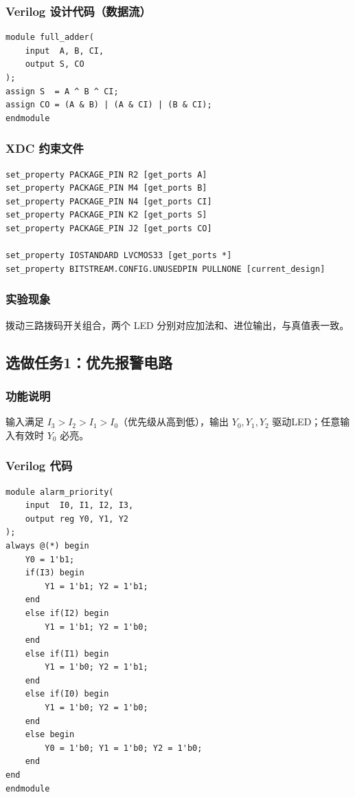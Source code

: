 \documentclass[11pt,a4paper]{article}
\begin{document}
\subsubsection{Verilog 设计代码（数据流）}
\begin{lstlisting}
module full_adder(
    input  A, B, CI,
    output S, CO
);
assign S  = A ^ B ^ CI;
assign CO = (A & B) | (A & CI) | (B & CI);
endmodule
\end{lstlisting}

\subsubsection{XDC 约束文件}
\begin{lstlisting}
set_property PACKAGE_PIN R2 [get_ports A]
set_property PACKAGE_PIN M4 [get_ports B]
set_property PACKAGE_PIN N4 [get_ports CI]
set_property PACKAGE_PIN K2 [get_ports S]
set_property PACKAGE_PIN J2 [get_ports CO]

set_property IOSTANDARD LVCMOS33 [get_ports *]
set_property BITSTREAM.CONFIG.UNUSEDPIN PULLNONE [current_design]
\end{lstlisting}

\subsubsection{实验现象}
拨动三路拨码开关组合，两个 LED 分别对应加法和、进位输出，与真值表一致。

\newpage
\subsection{选做任务1：优先报警电路}
\subsubsection{功能说明}
输入满足 $I_3>I_2>I_1>I_0$（优先级从高到低），输出 $Y_0,Y_1,Y_2$ 驱动LED；任意输入有效时 $Y_0$ 必亮。
\subsubsection{Verilog 代码}
\begin{lstlisting}
module alarm_priority(
    input  I0, I1, I2, I3,
    output reg Y0, Y1, Y2
);
always @(*) begin
    Y0 = 1'b1;
    if(I3) begin
        Y1 = 1'b1; Y2 = 1'b1;
    end
    else if(I2) begin
        Y1 = 1'b1; Y2 = 1'b0;
    end
    else if(I1) begin
        Y1 = 1'b0; Y2 = 1'b1;
    end
    else if(I0) begin
        Y1 = 1'b0; Y2 = 1'b0;
    end
    else begin
        Y0 = 1'b0; Y1 = 1'b0; Y2 = 1'b0;
    end
end
endmodule
\end{lstlisting}
\end{document}
